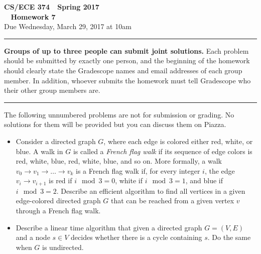 \documentclass[11pt]{article}
\begin{document}

\thispagestyle{empty}

\begin{center}
\Large\textbf{CS/ECE 374 \,\decosix\,  Spring 2017}%
\\
\LARGE\textbf{\decothreeleft~ Homework 7 ~\decothreeright}%
\\[0.5ex]
\large Due Wednesday, March 29, 2017 at 10am
\end{center}

\bigskip
\hrule
\bigskip

\noindent
\textbf{Groups of up to three people can submit joint solutions.}  Each problem should be submitted by exactly one person, and the beginning of the homework should clearly state the Gradescope names and email addresses of each group member.  In addition, whoever submits the homework must tell Gradescope who their other group members are.
\bigskip
\hrule
\bigskip


\noindent
The following unnumbered problems are not for submission or grading. 
No solutions for them will be provided but you can discuss them on Piazza.
\begin{itemize}
\item Consider a directed graph $G$, where each edge is colored either
  red, white, or blue. A walk in $G$ is called a {\em French flag
    walk} if its sequence of edge colors is red, white, blue, red,
  white, blue, and so on. More formally, a walk $v_0\rightarrow v_1
  \rightarrow \ldots \rightarrow v_k$ is a French flag walk if, for
  every integer $i$, the edge $v_i \rightarrow v_{i+1}$ is red if $i
  \mod 3 = 0$, white if $i \mod 3 = 1$, and blue if $i \mod 3 = 2$.
  Describe an efficient algorithm to find all vertices in a given
  edge-colored directed graph $G$ that can be reached from a given
  vertex $v$ through a French flag walk.
\item Describe a linear time algorithm that given a directed graph
  $G=(V,E)$ and a node $s \in V$ decides whether there is a cycle
  containing $s$. Do the same when $G$ is undirected.
\end{itemize}

\vspace{1cm}
\end{document}
